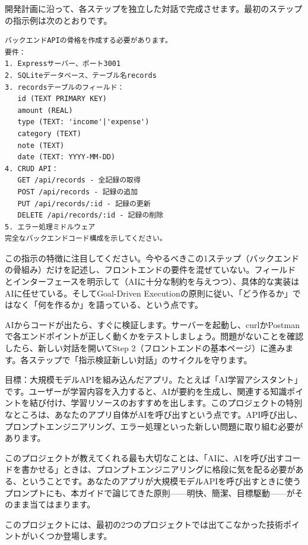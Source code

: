 開発計画に沿って、各ステップを独立した対話で完成させます。最初のステップの指示例は次のとおりです。

\begin{lstlisting}
バックエンドAPIの骨格を作成する必要があります。
要件：
1. Expressサーバー、ポート3001
2. SQLiteデータベース、テーブル名records
3. recordsテーブルのフィールド：
   id (TEXT PRIMARY KEY)
   amount (REAL)
   type (TEXT: 'income'|'expense')
   category (TEXT)
   note (TEXT)
   date (TEXT: YYYY-MM-DD)
4. CRUD API：
   GET /api/records - 全記録の取得
   POST /api/records - 記録の追加
   PUT /api/records/:id - 記録の更新
   DELETE /api/records/:id - 記録の削除
5. エラー処理ミドルウェア
完全なバックエンドコード構成を示してください。
\end{lstlisting}

この指示の特徴に注目してください。今やるべきこの1ステップ（バックエンドの骨組み）だけを記述し、フロントエンドの要件を混ぜていない。フィールドとインターフェースを明示して（AIに十分な制約を与えつつ）、具体的な実装はAIに任せている。そしてGoal-Driven Executionの原則に従い、「どう作るか」ではなく「何を作るか」を語っている、という点です。

AIからコードが出たら、すぐに検証します。サーバーを起動し、curlかPostmanで各エンドポイントが正しく動くかをテストしましょう。問題がないことを確認したら、新しい対話を開いてStep 2（フロントエンドの基本ページ）に進みます。各ステップで「指示検証新しい対話」のサイクルを守ります。



目標：大規模モデルAPIを組み込んだアプリ。たとえば「AI学習アシスタント」です。ユーザーが学習内容を入力すると、AIが要約を生成し、関連する知識ポイントを結び付け、学習リソースのおすすめを出します。このプロジェクトの特別なところは、あなたのアプリ自体がAIを呼び出すという点です。API呼び出し、プロンプトエンジニアリング、エラー処理といった新しい問題に取り組む必要があります。

このプロジェクトが教えてくれる最も大切なことは、「AIに、AIを呼び出すコードを書かせる」ときは、プロンプトエンジニアリングに格段に気を配る必要がある、ということです。あなたのアプリが大規模モデルAPIを呼び出すときに使うプロンプトにも、本ガイドで論じてきた原則——明快、簡潔、目標駆動——がそのまま当てはまります。


このプロジェクトには、最初の2つのプロジェクトでは出てこなかった技術ポイントがいくつか登場します。

